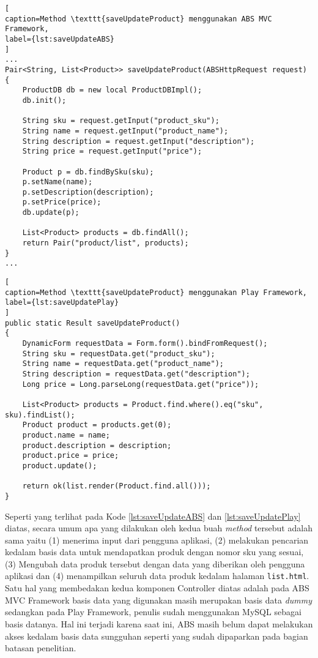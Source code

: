 \begin{minipage}{\linewidth}
\begin{lstlisting}[
caption=Method \texttt{saveUpdateProduct} menggunakan ABS MVC Framework,
label={lst:saveUpdateABS}
]
...
Pair<String, List<Product>> saveUpdateProduct(ABSHttpRequest request)
{
	ProductDB db = new local ProductDBImpl();
	db.init();
	
	String sku = request.getInput("product_sku");
	String name = request.getInput("product_name");
	String description = request.getInput("description");
	String price = request.getInput("price");
	
	Product p = db.findBySku(sku);
	p.setName(name);
	p.setDescription(description);
	p.setPrice(price);
	db.update(p);
	
	List<Product> products = db.findAll();
	return Pair("product/list", products);
}
...
\end{lstlisting}
\end{minipage}

\begin{lstlisting}[
caption=Method \texttt{saveUpdateProduct} menggunakan Play Framework,
label={lst:saveUpdatePlay}
]
public static Result saveUpdateProduct()
{
    DynamicForm requestData = Form.form().bindFromRequest();
    String sku = requestData.get("product_sku");
    String name = requestData.get("product_name");
    String description = requestData.get("description");
    Long price = Long.parseLong(requestData.get("price"));

    List<Product> products = Product.find.where().eq("sku", sku).findList();
    Product product = products.get(0);
    product.name = name;
    product.description = description;
    product.price = price;
    product.update();

    return ok(list.render(Product.find.all()));
}
\end{lstlisting}

Seperti yang terlihat pada Kode \ref{lst:saveUpdateABS} dan \ref{lst:saveUpdatePlay} diatas, secara umum apa yang dilakukan oleh kedua buah \textit{method} tersebut adalah sama yaitu (1) menerima input dari pengguna aplikasi, (2) melakukan pencarian kedalam basis data untuk mendapatkan produk dengan nomor sku yang sesuai, (3) Mengubah data produk tersebut dengan data yang diberikan oleh pengguna aplikasi dan (4) menampilkan seluruh data produk kedalam halaman \texttt{list.html}. Satu hal yang membedakan kedua komponen Controller diatas adalah pada ABS MVC Framework basis data yang digunakan masih merupakan basis data \textit{dummy} sedangkan pada Play Framework, penulis sudah menggunakan MySQL sebagai basis datanya. Hal ini terjadi karena saat ini, ABS masih belum dapat melakukan akses kedalam basis data sungguhan seperti yang sudah dipaparkan pada bagian batasan penelitian.\\

